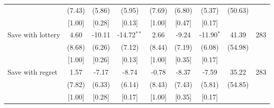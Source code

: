 \begin{table}[htbp]
{\begin{threeparttable}
\begin{tabular}{l*{8}{c}}
          &   (7.43)&   (5.86)&   (5.95)&   (7.69)&   (6.80)&   (5.37)&  (50.63)&         \\
          &   [1.00]&   [0.28]&   [0.13]&   [1.00]&   [0.47]&   [0.17]&         &         \\
Save with lottery&     4.60&   -10.11&-14.72$^{**}$&     2.66&    -9.24&-11.90$^{*}$&    41.39&      283\\
          &   (8.68)&   (6.26)&   (7.12)&   (8.44)&   (7.19)&   (6.08)&  (54.98)&         \\
          &   [1.00]&   [0.26]&   [0.13]&   [1.00]&   [0.35]&   [0.17]&         &         \\
Save with regret&     1.57&    -7.17&    -8.74&    -0.78&    -8.37&    -7.59&    35.22&      283\\
          &   (7.82)&   (6.33)&   (6.14)&   (8.43)&   (7.43)&   (5.81)&  (54.85)&         \\
          &   [1.00]&   [0.28]&   [0.17]&   [1.00]&   [0.35]&   [0.17]&         &         \\
\bottomrule \end{tabular} \begin{tablenotes}[flushleft] \footnotesize \item  \end{tablenotes} \end{threeparttable} } \end{table}

